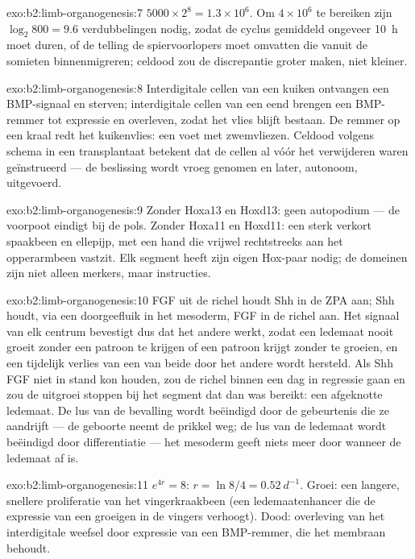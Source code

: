 \begin{solution}{exo:b2:limb-organogenesis:7}
$5000\times 2^{8} = 1.3\times 10^{6}$. Om $4\times 10^{6}$ te bereiken zijn
$\log_2 800 = 9.6$ verdubbelingen nodig, zodat de cyclus gemiddeld ongeveer
\qty{10}{h} moet duren, of de telling de spiervoorlopers moet omvatten die
vanuit de somieten binnenmigreren; celdood zou de discrepantie groter maken,
niet kleiner.
\end{solution}

\begin{solution}{exo:b2:limb-organogenesis:8}
Interdigitale cellen van een kuiken ontvangen een BMP-signaal en sterven;
interdigitale cellen van een eend brengen een BMP-remmer tot expressie en
overleven, zodat het vlies blijft bestaan. De remmer op een kraal redt het
kuikenvlies: een voet met zwemvliezen. Celdood volgens schema in een
transplantaat betekent dat de cellen al vóór het verwijderen waren
geïnstrueerd --- de beslissing wordt vroeg genomen en later, autonoom,
uitgevoerd.
\end{solution}

\begin{solution}{exo:b2:limb-organogenesis:9}
Zonder Hoxa13 en Hoxd13: geen autopodium --- de voorpoot eindigt bij de pols.
Zonder Hoxa11 en Hoxd11: een sterk verkort spaakbeen en ellepijp, met een
hand die vrijwel rechtstreeks aan het opperarmbeen vastzit. Elk segment
heeft zijn eigen Hox-paar nodig; de domeinen zijn niet alleen merkers, maar
instructies.
\end{solution}

\begin{solution}{exo:b2:limb-organogenesis:10}
FGF uit de richel houdt Shh in de ZPA aan; Shh houdt, via een doorgeefluik
in het mesoderm, FGF in de richel aan. Het signaal van elk centrum bevestigt
dus dat het andere werkt, zodat een ledemaat nooit groeit zonder een patroon
te krijgen of een patroon krijgt zonder te groeien, en een tijdelijk verlies
van een van beide door het andere wordt hersteld. Als Shh FGF niet in stand
kon houden, zou de richel binnen een dag in regressie gaan en zou de uitgroei
stoppen bij het segment dat dan was bereikt: een afgeknotte ledemaat. De lus
van de bevalling wordt beëindigd door de gebeurtenis die ze aandrijft ---
de geboorte neemt de prikkel weg; de lus van de ledemaat wordt beëindigd
door differentiatie --- het mesoderm geeft niets meer door wanneer de
ledemaat af is.
\end{solution}

\begin{solution}{exo:b2:limb-organogenesis:11}
$e^{4r} = 8$: $r = \ln 8/4 = \qty{0.52}{d^{-1}}$. Groei: een langere,
snellere proliferatie van het vingerkraakbeen (een ledemaatenhancer die de
expressie van een groeigen in de vingers verhoogt). Dood: overleving van
het interdigitale weefsel door expressie van een BMP-remmer, die het
membraan behoudt.
\end{solution}

